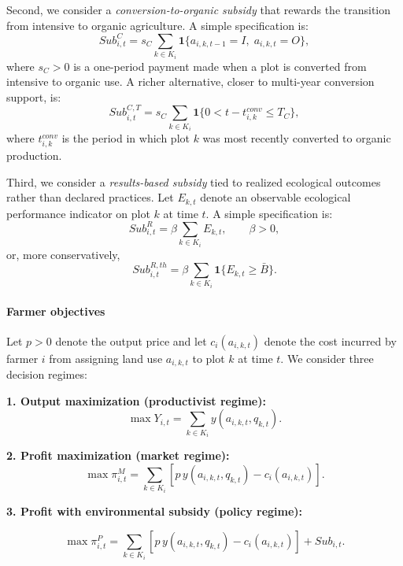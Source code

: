 \documentclass{article}
\begin{document}
Second, we consider a \emph{conversion-to-organic subsidy} that rewards the transition from intensive to organic agriculture. A simple specification is:
\[
Sub^{C}_{i,t} = s_C \sum_{k \in K_i} \mathbf{1}\{a_{i,k,t-1}=I,\; a_{i,k,t}=O\},
\]
where $s_C>0$ is a one-period payment made when a plot is converted from intensive to organic use. A richer alternative, closer to multi-year conversion support, is:
\[
Sub^{C,T}_{i,t} = s_C \sum_{k \in K_i} \mathbf{1}\{0 < t-t^{conv}_{i,k} \leq T_C\},
\]
where $t^{conv}_{i,k}$ is the period in which plot $k$ was most recently converted to organic production.

Third, we consider a \emph{results-based subsidy} tied to realized ecological outcomes rather than declared practices. Let $E_{k,t}$ denote an observable ecological performance indicator on plot $k$ at time $t$. A simple specification is:
\[
Sub^{R}_{i,t} = \beta \sum_{k \in K_i} E_{k,t}, \qquad \beta > 0,
\]
or, more conservatively,
\[
Sub^{R,th}_{i,t} = \beta \sum_{k \in K_i} \mathbf{1}\{E_{k,t} \geq \bar B\}.
\]

\paragraph{Farmer objectives}
Let $p>0$ denote the output price and let $c_i(a_{i,k,t})$ denote the cost incurred by farmer $i$ from assigning land use $a_{i,k,t}$ to plot $k$ at time $t$. We consider three decision regimes:

\textbf{1. Output maximization (productivist regime):}
\[
\max Y_{i,t} = \sum_{k \in K_i} y(a_{i,k,t}, q_{k,t}).
\]

\textbf{2. Profit maximization (market regime):}
\[
\max \pi^{M}_{i,t} =
\sum_{k \in K_i} \left[p\, y(a_{i,k,t}, q_{k,t}) - c_i(a_{i,k,t}) \right].
\]

\textbf{3. Profit with environmental subsidy (policy regime):}

\[
\max \pi^{P}_{i,t} =
\sum_{k \in K_i} \left[p\, y(a_{i,k,t}, q_{k,t}) - c_i(a_{i,k,t}) \right]
+ Sub_{i,t}.
\]
\end{document}

